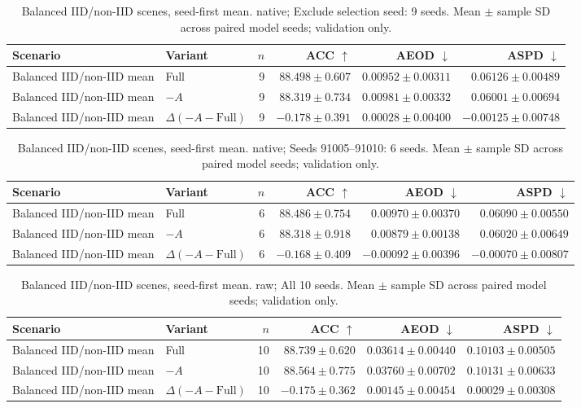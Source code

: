 \begin{table}[t]
\centering
\small
\caption{Balanced IID/non-IID scenes, seed-first mean. native; Exclude selection seed: 9 seeds. Mean $\pm$ sample SD across paired model seeds; validation only.}
\begin{tabular}{llrrrr}
\toprule
Scenario & Variant & $n$ & ACC $\uparrow$ & AEOD $\downarrow$ & ASPD $\downarrow$ \\
\midrule
Balanced IID/non-IID mean & Full & 9 & $88.498 \pm 0.607$ & $0.00952 \pm 0.00311$ & $0.06126 \pm 0.00489$ \\
Balanced IID/non-IID mean & $-A$ & 9 & $88.319 \pm 0.734$ & $0.00981 \pm 0.00332$ & $0.06001 \pm 0.00694$ \\
Balanced IID/non-IID mean & $\Delta(-A-\mathrm{Full})$ & 9 & $-0.178 \pm 0.391$ & $0.00028 \pm 0.00400$ & $-0.00125 \pm 0.00748$ \\
\bottomrule
\end{tabular}
\end{table}

\begin{table}[t]
\centering
\small
\caption{Balanced IID/non-IID scenes, seed-first mean. native; Seeds 91005–91010: 6 seeds. Mean $\pm$ sample SD across paired model seeds; validation only.}
\begin{tabular}{llrrrr}
\toprule
Scenario & Variant & $n$ & ACC $\uparrow$ & AEOD $\downarrow$ & ASPD $\downarrow$ \\
\midrule
Balanced IID/non-IID mean & Full & 6 & $88.486 \pm 0.754$ & $0.00970 \pm 0.00370$ & $0.06090 \pm 0.00550$ \\
Balanced IID/non-IID mean & $-A$ & 6 & $88.318 \pm 0.918$ & $0.00879 \pm 0.00138$ & $0.06020 \pm 0.00649$ \\
Balanced IID/non-IID mean & $\Delta(-A-\mathrm{Full})$ & 6 & $-0.168 \pm 0.409$ & $-0.00092 \pm 0.00396$ & $-0.00070 \pm 0.00807$ \\
\bottomrule
\end{tabular}
\end{table}

\begin{table}[t]
\centering
\small
\caption{Balanced IID/non-IID scenes, seed-first mean. raw; All 10 seeds. Mean $\pm$ sample SD across paired model seeds; validation only.}
\begin{tabular}{llrrrr}
\toprule
Scenario & Variant & $n$ & ACC $\uparrow$ & AEOD $\downarrow$ & ASPD $\downarrow$ \\
\midrule
Balanced IID/non-IID mean & Full & 10 & $88.739 \pm 0.620$ & $0.03614 \pm 0.00440$ & $0.10103 \pm 0.00505$ \\
Balanced IID/non-IID mean & $-A$ & 10 & $88.564 \pm 0.775$ & $0.03760 \pm 0.00702$ & $0.10131 \pm 0.00633$ \\
Balanced IID/non-IID mean & $\Delta(-A-\mathrm{Full})$ & 10 & $-0.175 \pm 0.362$ & $0.00145 \pm 0.00454$ & $0.00029 \pm 0.00308$ \\
\bottomrule
\end{tabular}
\end{table}

